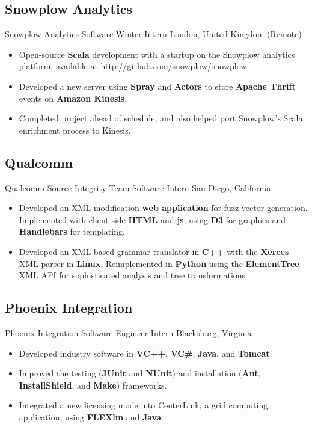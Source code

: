 \documentclass[11pt,letter,sans]{moderncv}
\begin{document}
    \subsection{Snowplow Analytics}
      {Snowplow Analytics}%
      {Software Winter Intern}%
      {London, United Kingdom (Remote)}%
      {}%
      {
        \begin{itemize}
        \item Open-source {\bf Scala} development with a startup on the Snowplow analytics platform, available at \url{http://github.com/snowplow/snowplow}.\item Developed a new server using {\bf Spray} and {\bf Actors} to store {\bf Apache Thrift} events on {\bf Amazon Kinesis}.\item Completed project ahead of schedule, and also helped port Snowplow's Scala enrichment process to Kinesis.\end{itemize}
      }
  
    \subsection{Qualcomm}
      {Qualcomm}%
      {Source Integrity Team Software Intern}%
      {San Diego, California}%
      {}%
      {
        \begin{itemize}
        \item Developed an XML modification {\bf web application} for fuzz vector generation. Implemented with client-side {\bf HTML} and {\bf js}, using {\bf D3} for graphics and {\bf Handlebars} for templating.\item Developed an XML-based grammar translator in {\bf C++} with the {\bf Xerces} XML parser in {\bf Linux}. Reimplemented in {\bf Python} using the {\bf ElementTree} XML API for sophisticated analysis and tree transformations.\end{itemize}
      }
  
    \subsection{Phoenix Integration}
      {Phoenix Integration}%
      {Software Engineer Intern}%
      {Blacksburg, Virginia}%
      {}%
      {
        \begin{itemize}
        \item Developed industry software in {\bf VC++}, {\bf VC\#}, {\bf Java}, and {\bf Tomcat}.\item Improved the testing ({\bf JUnit} and {\bf NUnit}) and installation ({\bf Ant}, {\bf InstallShield}, and {\bf Make}) frameworks.\item Integrated a new licensing mode into CenterLink, a grid computing application, using {\bf FLEXlm} and {\bf Java}.\end{itemize}
      }
  
\end{document}
